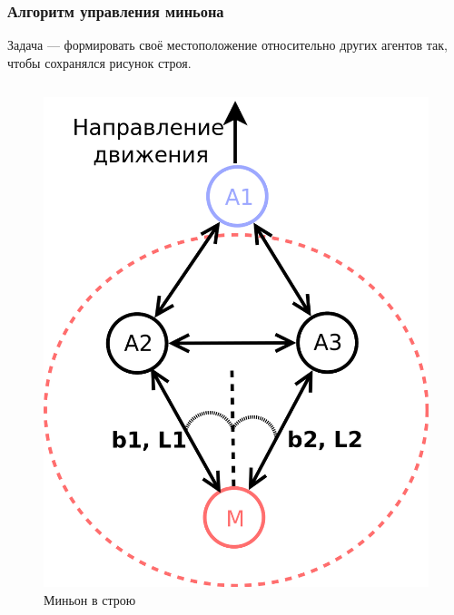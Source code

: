 \documentclass[10pt]{beamer}
\begin{document}
\begin{frame}
	\frametitle{Алгоритм управления миньона}
	Задача — формировать своё местоположение относительно других агентов так, чтобы сохранялся рисунок строя.
	\begin{columns}
		
		\begin{figure}
			\centering
			\includegraphics[width=0.8\linewidth]{others/minions-alg}
			\caption{Миньон в строю}
			\label{fig:minions-alg}
		\end{figure}
		

\end{columns}
\end{frame}
\end{document}
